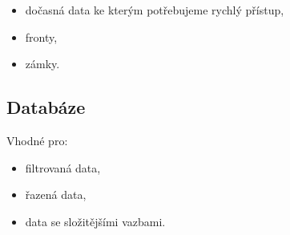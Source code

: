 \begin{itemize}
	\item dočasná data ke kterým potřebujeme rychlý přístup,
	\item fronty,
	\item zámky.
\end{itemize}
\cite{redis}

\subsection{Databáze}

Vhodné pro:

\begin{itemize}
	\item filtrovaná data,
	\item řazená data,
	\item data se složitějšími vazbami.
\end{itemize}

